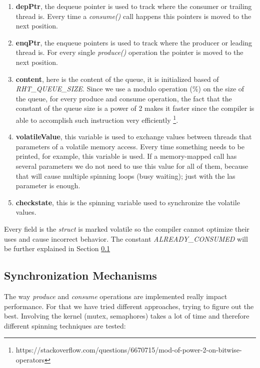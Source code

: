 \begin{enumerate}
\item \textbf{depPtr}, the dequeue pointer is used to track where the consumer or trailing thread is. Every time a \textit{consume()} call happens this pointers is moved to the next position. 
\item \textbf{enqPtr}, the enqueue pointers is used to track where the producer or leading thread is. For every single \textit{produce()} operation the pointer is moved to the next position. 
\item \textbf{content}, here is the content of the queue, it is initialized based of \textit{RHT\_QUEUE\_SIZE}. Since we use a modulo operation (\%) on the size of the queue, for every produce and consume operation, the fact that the constant of the queue size is a power of 2 makes it faster since the compiler is able to accomplish such instruction very efficiently \footnote{https://stackoverflow.com/questions/6670715/mod-of-power-2-on-bitwise-operators}.
\item \textbf{volatileValue}, this variable is used to exchange values between threads that parameters of a volatile memory access. Every time something needs to be printed, for example, this variable is used. If a memory-mapped call has several parameters we do not need to use this value for all of them, because that will cause multiple spinning loops (busy waiting); just with the las parameter is enough. 
\item \textbf{checkstate}, this is the spinning variable used to synchronize the volatile values. 
\end{enumerate}

Every field is the \textit{struct} is marked volatile so the compiler cannot optimize their uses and cause incorrect behavior. The constant \textit{ALREADY\_CONSUMED} will be further explained in Section \ref{subsec:syncMechanism}

\subsection{Synchronization Mechanisms}
\label{subsec:syncMechanism}

The way \textit{produce} and \textit{consume} operations are implemented really impact performance. For that we have tried different approaches, trying to figure out the best. Involving the kernel (mutex, semaphores) takes a lot of time and therefore different spinning techniques are tested:

